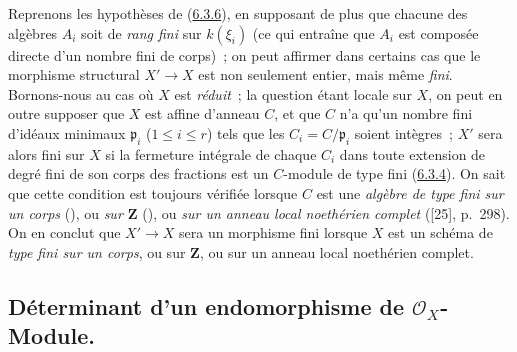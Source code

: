 \begin{remark}[6.3.10]
\label{II.6.3.10-fr}
Reprenons les hypothèses de (\hyperref[II.6.3.6-fr]{6.3.6}), en supposant de
plus que chacune des algèbres $A_i$ soit de \emph{rang fini} sur $k(\xi_i)$
(ce qui entraîne que $A_i$ est composée directe d'un nombre fini de corps)~;
on peut affirmer dans certains cas que le morphisme structural $X'\to X$ est
non seulement entier, mais même \emph{fini}. Bornons-nous au cas où $X$ est
\emph{réduit}~; la question étant locale sur $X$, on peut en outre supposer
que $X$ est affine d'anneau $C$, et que $C$ n'a qu'un nombre fini d'idéaux
minimaux $\mathfrak{p}_i$ ($1\leq i\leq r$) tels que les
$C_i=C/\mathfrak{p}_i$ soient intègres~; $X'$ sera alors fini sur $X$ si la
fermeture intégrale de chaque $C_i$ dans toute extension de degré fini de son
corps des fractions est un $C$-module de type fini
(\hyperref[II.6.3.4-fr]{6.3.4}). On sait que cette condition est toujours
vérifiée lorsque $C$ est une \emph{algèbre de type fini sur un corps}
(\cite[t.~I, p.~267, th.~9]{I-13}), ou \emph{sur $\mathbf{Z}$}
(\cite[t.~I, p.~93, th.~3]{I-9}), ou \emph{sur un anneau local noethérien
complet} ([25], p.~298). On en conclut que $X'\to X$ sera un morphisme
fini lorsque $X$ est un schéma de \emph{type fini sur un corps}, ou sur
$\mathbf{Z}$, ou sur un anneau local noethérien complet.
\end{remark}

\subsection{Déterminant d'un endomorphisme de $\mathcal{O}_X$-Module.}
\label{subsection:II.6.4-fr}

